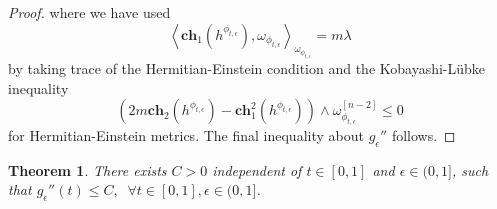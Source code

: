 \documentclass[10pt, letterpaper]{amsart}
\theoremstyle{plain}
\newtheorem{theorem}{Theorem}[section]
\theoremstyle{definition}
\numberwithin{equation}{section}
\begin{document}
\begin{proof}
		where we have used 
		\[
		\left\langle \mathbf{ch}_1\left(h^{\phi_{t,\epsilon}}\right), \omega_{\phi_{t,\epsilon}}\right\rangle_{\omega_{\phi_{t,\epsilon}}}
		=
		m\lambda
		\]
		by taking trace of the Hermitian-Einstein condition
		and the Kobayashi-L\"ubke inequality \cite{Ko}
		\begin{equation}
        \label{ineq:KL-inequality}
		\left(2m \mathbf{ch}_2\left(h^{\phi_{t,\epsilon}}\right)-\mathbf{ch}_1^2\left(h^{\phi_{t,\epsilon}}\right)\right)\wedge \omega_{\phi_{t,\epsilon}}^{[n-2]}
		\leq 
		0
		\end{equation}
		for Hermitian-Einstein metrics. The final inequality about $g_\epsilon''$ follows. 
	\end{proof}

\begin{theorem}There exists $C>0$ independent of $t\in [0,1]$ and $\epsilon\in (0,1]$, such that $g_\epsilon''(t)\leq C, \;\; \forall t\in [0,1], \epsilon\in (0,1]$. 
\end{theorem}
\end{document}
